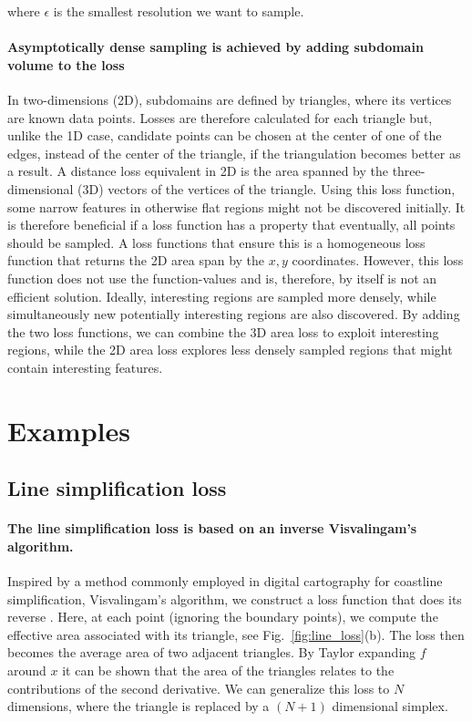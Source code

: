 \documentclass[english, twocolumn, 10pt, aps, superscriptaddress, floatfix, prb, citeautoscript]{revtex4-1}
\renewcommand{\citep}{\cite}
\begin{document}
where \(\epsilon\) is the smallest resolution we want to sample.

\paragraph{Asymptotically dense sampling is achieved by adding subdomain volume to the loss}

In two-dimensions (2D), subdomains are defined by triangles, where its vertices are known data points.
Losses are therefore calculated for each triangle but, unlike the 1D case, candidate points can be chosen at the center of one of the edges, instead of the center of the triangle, if the triangulation becomes better as a result.
A distance loss equivalent in 2D is the area spanned by the three-dimensional (3D) vectors of the vertices of the triangle.
Using this loss function, some narrow features in otherwise flat regions might not be discovered initially.
It is therefore beneficial if a loss function has a property that eventually, all points should be sampled.
A loss functions that ensure this is a homogeneous loss function that returns the 2D area span by the \(x, y\) coordinates.
However, this loss function does not use the function-values and is, therefore, by itself is not an efficient solution.
Ideally, interesting regions are sampled more densely, while simultaneously new potentially interesting regions are also discovered.
By adding the two loss functions, we can combine the 3D area loss to exploit interesting regions, while the 2D area loss explores less densely sampled regions that might contain interesting features.

\section{Examples}

\subsection{Line simplification loss}

\paragraph{The line simplification loss is based on an inverse Visvalingam's algorithm.}

Inspired by a method commonly employed in digital cartography for coastline simplification, Visvalingam's algorithm, we construct a loss function that does its reverse \citep{Visvalingam1990}.
Here, at each point (ignoring the boundary points), we compute the effective area associated with its triangle, see Fig.~\ref{fig:line_loss}(b).
The loss then becomes the average area of two adjacent triangles.
By Taylor expanding \(f\) around \(x\) it can be shown that the area of the triangles relates to the contributions of the second derivative.
We can generalize this loss to \(N\) dimensions, where the triangle is replaced by a \((N+1)\) dimensional simplex.
\end{document}
